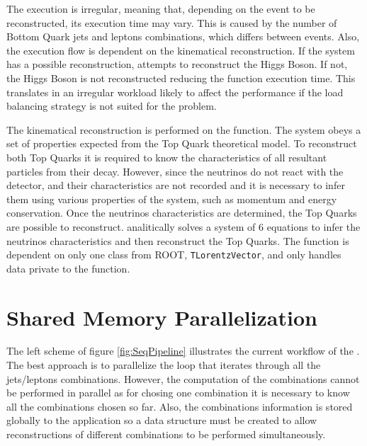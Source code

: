 The \ttDilepKinFit execution is irregular, meaning that, depending on the event to be reconstructed, its execution time may vary. This is caused by the number of Bottom Quark jets and leptons combinations, which differs between events. Also, the execution flow is dependent on the kinematical reconstruction. If the \ttbar system has a possible reconstruction, \ttDilepKinFit attempts to reconstruct the Higgs Boson. If not, the Higgs Boson is not reconstructed reducing the function execution time. This translates in an irregular workload likely to affect the performance if the load balancing strategy is not suited for the problem.

The kinematical reconstruction is performed on the \dilep function. The \ttbar system obeys a set of properties expected from the Top Quark theoretical model. To reconstruct both Top Quarks it is required to know the characteristics of all resultant particles from their decay. However, since the neutrinos do not react with the detector, and their characteristics are not recorded and it is necessary to infer them using various properties of the system, such as momentum and energy conservation. Once the neutrinos characteristics are determined, the Top Quarks are possible to reconstruct. \dilep analitically solves a system of 6 equations to infer the neutrinos characteristics and then reconstruct the Top Quarks. The function is dependent on only one class from ROOT, \texttt{TLorentzVector}, and only handles data private to the function.

\section{Shared Memory Parallelization}
\label{Parallelization:SharedMem}

The left scheme of figure \ref{fig:SeqPipeline} illustrates the current workflow of the \ttDilepKinFit. The best approach is to parallelize the loop that iterates through all the jets/leptons combinations. However, the computation of the combinations cannot be performed in parallel as for chosing one combination it is necessary to know all the combinations chosen so far. Also, the combinations information is stored globally to the application so a data structure must be created to allow reconstructions of different combinations to be performed simultaneously.


